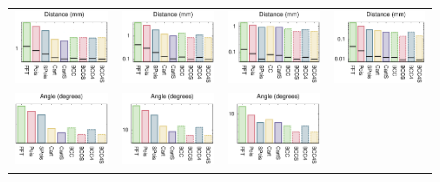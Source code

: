 \begin{figure} 
	\centering
	\begin{tabular}{c c c c}
	\includegraphics[width=0.23\linewidth]{figures/dist32.eps} &
	\includegraphics[width=0.23\linewidth]{figures/dist64.eps} &
	\includegraphics[width=0.23\linewidth]{figures/dist128.eps} &
	\includegraphics[width=0.23\linewidth]{figures/dist256.eps} \\
	\includegraphics[width=0.23\linewidth]{figures/angle32.eps} &
	\includegraphics[width=0.23\linewidth]{figures/angle64.eps} &
	\includegraphics[width=0.23\linewidth]{figures/angle128.eps} &

\end{tabular}
\end{figure}
